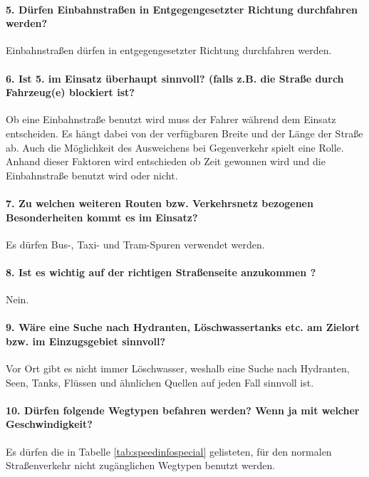\paragraph*{5. Dürfen Einbahnstraßen in Entgegengesetzter Richtung durchfahren werden?}
\label{frage5}
\par
Einbahnstraßen dürfen in entgegengesetzter Richtung durchfahren werden.

\paragraph*{6. Ist 5. im Einsatz überhaupt sinnvoll? (falls z.B. die Straße durch Fahrzeug(e) blockiert ist?}
\label{frage6}
\par
Ob eine Einbahnstraße benutzt wird muss der Fahrer während dem Einsatz entscheiden.
Es hängt dabei von der verfügbaren Breite und der Länge der Straße ab.
Auch die Möglichkeit des Ausweichens bei Gegenverkehr spielt eine Rolle.
Anhand dieser Faktoren wird entschieden ob Zeit gewonnen wird und die Einbahnstraße benutzt wird oder nicht.

\paragraph*{7. Zu welchen weiteren Routen bzw. Verkehrsnetz bezogenen Besonderheiten kommt es im Einsatz?}
\label{frage7}
\par
Es dürfen Bus-, Taxi- und Tram-Spuren verwendet werden.

\paragraph*{8. Ist es wichtig auf der richtigen Straßenseite anzukommen ?}
\par
Nein.

\paragraph*{9. Wäre eine Suche nach Hydranten, Löschwassertanks etc. am Zielort bzw. im Einzugsgebiet sinnvoll?}
\label{frage9}
\par
Vor Ort gibt es nicht immer Löschwasser, weshalb eine Suche nach Hydranten, Seen, Tanks, Flüssen und ähnlichen Quellen auf jeden Fall sinnvoll ist.

\paragraph*{10. Dürfen folgende Wegtypen befahren werden? Wenn ja mit welcher Geschwindigkeit?}
\label{frage10}
\par
Es dürfen die in Tabelle \ref{tab:speedinfospecial} gelisteten, für den normalen Straßenverkehr nicht zugänglichen Wegtypen benutzt werden.

